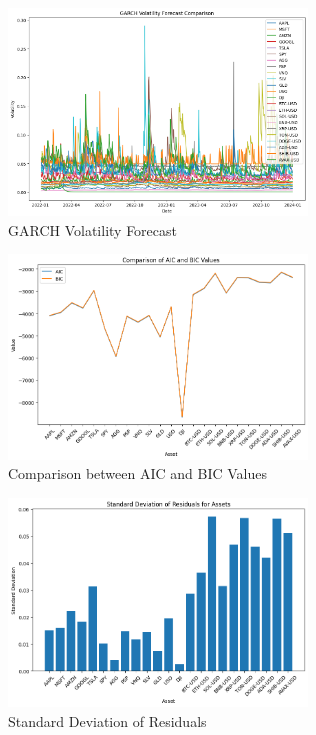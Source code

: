 \begin{figure}
    \centering
    \includegraphics[width=300px]{code/volatility-analysis/garch-with-mulit-assets/garch_forecast.png}
    \caption{GARCH Volatility Forecast}
    \label{fig:garch_forecast}
\end{figure}

\begin{figure}
    \centering
    \includegraphics[width=300px]{code/volatility-analysis/garch-with-mulit-assets/aic_bic.png}
    \caption{Comparison between AIC and BIC Values}
    \label{fig:aic_bic}
\end{figure}

\begin{figure}
    \centering
    \includegraphics[width=300px]{code/volatility-analysis/garch-with-mulit-assets/standard_deviation.png}
    \caption{Standard Deviation of Residuals}
    \label{fig:standard_deviation}
\end{figure}

